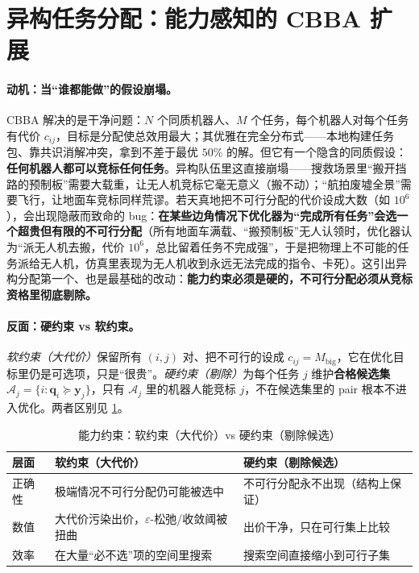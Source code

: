 \section{异构任务分配：能力感知的 CBBA 扩展}
\label{sec:hmr-cbba}

\paragraph{动机：当“谁都能做”的假设崩塌。}
CBBA 解决的是干净问题：$N$ 个同质机器人、$M$ 个任务，每个机器人对每个任务有代价 $c_{ij}$，目标是分配使总效用最大；其优雅在完全分布式——本地构建任务包、靠共识消解冲突，拿到不差于最优 $50\%$ 的解\cite{choi2009cbba}。但它有一个隐含的同质假设：\textbf{任何机器人都可以竞标任何任务}。异构队伍里这直接崩塌——搜救场景里“搬开挡路的预制板”需要大载重，让无人机竞标它毫无意义（搬不动）；“航拍废墟全景”需要飞行，让地面车竞标同样荒谬。若天真地把不可行分配的代价设成大数（如 $10^6$），会出现隐蔽而致命的 bug：\textbf{在某些边角情况下优化器为“完成所有任务”会选一个超贵但有限的不可行分配}（所有地面车满载、“搬预制板”无人认领时，优化器认为“派无人机去搬，代价 $10^6$，总比留着任务不完成强”，于是把物理上不可能的任务派给无人机，仿真里表现为无人机收到永远无法完成的指令、卡死）。这引出异构分配第一个、也是最基础的改动：\textbf{能力约束必须是硬的，不可行分配必须从竞标资格里彻底剔除。}

\paragraph{反面：硬约束 vs 软约束。}
\emph{软约束（大代价）}保留所有 $(i,j)$ 对、把不可行的设成 $c_{ij}=M_{\mathrm{big}}$，它在优化目标里仍是可选项，只是“很贵”。\emph{硬约束（剔除）}为每个任务 $j$ 维护\textbf{合格候选集} $\mathcal{A}_j=\{i:\mathbf{q}_i\succeq\mathbf{y}_j\}$，只有 $\mathcal{A}_j$ 里的机器人能竞标 $j$，不在候选集里的 pair 根本不进入优化。两者区别见 \cref{tab:hmr-hard-soft}。

\begin{table}[H]\centering\small
\caption{能力约束：软约束（大代价）vs 硬约束（剔除候选）}
\label{tab:hmr-hard-soft}
\begin{tabular}{lll}
\toprule
层面 & 软约束（大代价） & 硬约束（剔除候选） \\
\midrule
正确性 & 极端情况不可行分配仍可能被选中 & 不可行分配永不出现（结构上保证） \\
数值 & 大代价污染出价，$\varepsilon$-松弛/收敛阈被扭曲 & 出价干净，只在可行集上比较 \\
效率 & 在大量“必不选”项的空间里搜索 & 搜索空间直接缩小到可行子集 \\
\bottomrule
\end{tabular}
\end{table}

